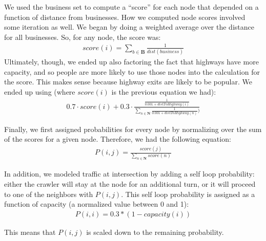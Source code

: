 \documentclass{article}
\begin{document}
We used the business set to compute a ``score'' for each node that depended on a function of distance from businesses. How we computed node scores involved some iteration as well. We began by doing a weighted average over the distance for all businesses. So, for any node, the score was:
\begin{eqnarray*}
	score(i) = \sum\limits_{b \in \mathbf{B}} \frac{1}{dist(business)}
\end{eqnarray*}
Ultimately, though, we ended up also factoring the fact that highways have more capacity, and so people are more likely to use those nodes into the calculation for the score. This makes sense because highway exits are likely to be popular. We ended up using (where $score(i)$ is the previous equation we had):
\begin{eqnarray*}
	0.7 \cdot score(i)+ 0.3 \cdot \frac{\frac{1}{0.001 + distToHighway(i)}}{\sum\limits_{n \in \mathbf{N}} \frac{1}{0.001 + distToHighway(n)})}
\end{eqnarray*}

Finally, we first assigned probabilities for every node by normalizing over the sum of the scores for a given node. Therefore, we had the following equation: \\
\begin{eqnarray*}
	P(i,j) = \frac{score(j)}{\sum\limits_{n \in \mathbf{N}} score(n)}
\end{eqnarray*}

In addition, we modeled traffic at intersection by adding a self loop probability: either the crawler will stay at the node for an additional turn, or it will proceed to one of the neighbors with $P(i, j)$. This self loop probability is assigned as a function of capacity (a normalized value between 0 and 1):
\begin{eqnarray*}
	P(i, i) = 0.3 * (1 - capacity(i))
\end{eqnarray*}

This means that $P(i, j)$ is scaled down to the remaining probability.
\end{document}

